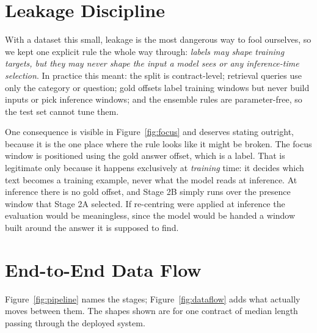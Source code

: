 \section{Leakage Discipline}
With a dataset this small, leakage is the most dangerous way to fool ourselves, so we kept one explicit rule the whole way through: \emph{labels may shape training targets, but they may never shape the input a model sees or any inference-time selection}. In practice this meant: the split is contract-level; retrieval queries use only the category or question; gold offsets label training windows but never build inputs or pick inference windows; and the ensemble rules are parameter-free, so the test set cannot tune them.

One consequence is visible in Figure~\ref{fig:focus} and deserves stating outright, because it is the one place where the rule looks like it might be broken. The focus window is positioned using the gold answer offset, which is a label. That is legitimate only because it happens exclusively at \emph{training} time: it decides which text becomes a training example, never what the model reads at inference. At inference there is no gold offset, and Stage 2B simply runs over the presence window that Stage 2A selected. If re-centring were applied at inference the evaluation would be meaningless, since the model would be handed a window built around the answer it is supposed to find.

\section{End-to-End Data Flow}
Figure~\ref{fig:pipeline} names the stages; Figure~\ref{fig:dataflow} adds what actually moves between them. The shapes shown are for one contract of median length passing through the deployed system.

